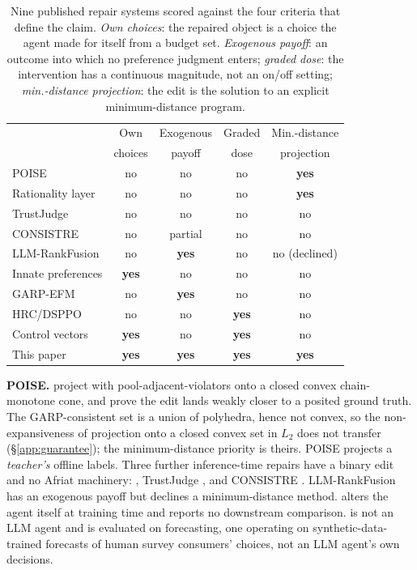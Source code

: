 \documentclass{article}
\begin{document}
\begin{table}[h]
\centering\footnotesize
\caption{Nine published repair systems scored against the four criteria that define the claim.
\emph{Own choices}: the repaired object is a choice the agent made for itself from a budget set.
\emph{Exogenous payoff}: an outcome into which no preference judgment enters; \emph{graded dose}:
the intervention has a continuous magnitude, not an on/off setting; \emph{min.-distance
projection}: the edit is the solution to an explicit minimum-distance program.}
\label{tab:related}
\begin{tabular}{lcccc}
\toprule
& Own & Exogenous & Graded & Min.-distance \\
& choices & payoff & dose & projection \\
\midrule
POISE \citep{wang2026poise}                       & no  & no  & no  & \textbf{yes} \\
Rationality layer \citep{chadwick2025dutchbooks}  & no  & no  & no  & \textbf{yes} \\
TrustJudge \citep{wang2025trustjudge}             & no  & no  & no  & no \\
CONSISTRE \citep{sun2026consistre}                & no  & partial & no & no \\
LLM-RankFusion \citep{zeng2024rankfusion}         & no  & \textbf{yes} & no & no (declined) \\
Innate preferences \citep{buchanan2026innate}     & \textbf{yes} & no & no & no \\
GARP-EFM \citep{aguiar2026garpefm}                & no  & \textbf{yes} & no & no \\
HRC/DSPPO \citep{huang2026hrc}                    & no  & no  & \textbf{yes} & no \\
Control vectors \citep{cook2026whatllmswant}      & \textbf{yes} & no & \textbf{yes} & no \\
\midrule
This paper                                        & \textbf{yes} & \textbf{yes} & \textbf{yes} & \textbf{yes} \\
\bottomrule
\end{tabular}
\end{table}

\textbf{POISE.} \citet{wang2026poise} project with pool-adjacent-violators onto a closed convex
chain-monotone cone, and prove the edit lands weakly closer to a posited ground truth. The
GARP-consistent set is a union of polyhedra, hence not convex, so the non-expansiveness of
projection onto a closed convex set in $L_2$ does not transfer (\S\ref{app:guarantee}); the
minimum-distance priority is theirs. POISE projects a \emph{teacher's} offline labels. Three
further inference-time repairs have a binary edit and no Afriat machinery:
\citet{chadwick2025dutchbooks}, TrustJudge \citep{wang2025trustjudge}, and CONSISTRE
\citep{sun2026consistre}. LLM-RankFusion \citep{zeng2024rankfusion} has an exogenous
payoff but declines a minimum-distance method. \citet{buchanan2026innate} alters the agent itself
at training time and reports no downstream comparison. \citet{aguiar2026garpefm} is not an LLM
agent and is evaluated on forecasting, one operating on synthetic-data-trained forecasts of human
survey consumers' choices, not an LLM agent's own decisions.
\end{document}
